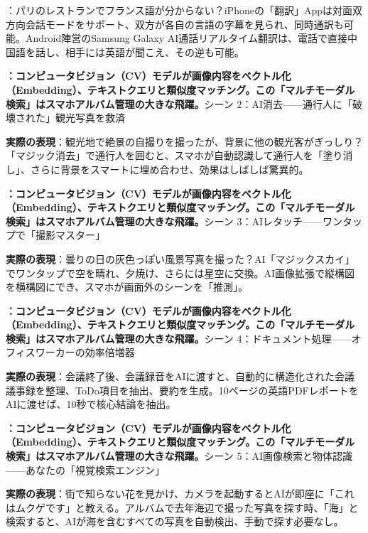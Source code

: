 
：パリのレストランでフランス語が分からない？iPhoneの「翻訳」Appは対面双方向会話モードをサポート、双方が各自の言語の字幕を見られ、同時通訳も可能。Android陣営のSamsung Galaxy AI通話リアルタイム翻訳は、電話で直接中国語を話し、相手には英語が聞こえ、その逆も可能。


\textbf{：コンピュータビジョン（CV）モデルが画像内容をベクトル化（Embedding）、テキストクエリと類似度マッチング。この「マルチモーダル検索」はスマホアルバム管理の大きな飛躍。}シーン 2：AI消去——通行人に「破壊された」観光写真を救済

\textbf{実際の表現}：観光地で絶景の自撮りを撮ったが、背景に他の観光客がぎっしり？「マジック消去」で通行人を囲むと、スマホが自動認識して通行人を「塗り消し」、さらに背景をスマートに埋め合わせ、効果はしばしば驚異的。


\textbf{：コンピュータビジョン（CV）モデルが画像内容をベクトル化（Embedding）、テキストクエリと類似度マッチング。この「マルチモーダル検索」はスマホアルバム管理の大きな飛躍。}シーン 3：AIレタッチ——ワンタップで「撮影マスター」

\textbf{実際の表現}：曇りの日の灰色っぽい風景写真を撮った？AI「マジックスカイ」でワンタップで空を晴れ、夕焼け、さらには星空に交換。AI画像拡張で縦構図を横構図にでき、スマホが画面外のシーンを「推測」。


\textbf{：コンピュータビジョン（CV）モデルが画像内容をベクトル化（Embedding）、テキストクエリと類似度マッチング。この「マルチモーダル検索」はスマホアルバム管理の大きな飛躍。}シーン 4：ドキュメント処理——オフィスワーカーの効率倍増器

\textbf{実際の表現}：会議終了後、会議録音をAIに渡すと、自動的に構造化された会議議事録を整理、ToDo項目を抽出、要約を生成。10ページの英語PDFレポートをAIに渡せば、10秒で核心結論を抽出。


\textbf{：コンピュータビジョン（CV）モデルが画像内容をベクトル化（Embedding）、テキストクエリと類似度マッチング。この「マルチモーダル検索」はスマホアルバム管理の大きな飛躍。}シーン 5：AI画像検索と物体認識——あなたの「視覚検索エンジン」

\textbf{実際の表現}：街で知らない花を見かけ、カメラを起動するとAIが即座に「これはムクゲです」と教える。アルバムで去年海辺で撮った写真を探す時、「海」と検索すると、AIが海を含むすべての写真を自動検出、手動で探す必要なし。

